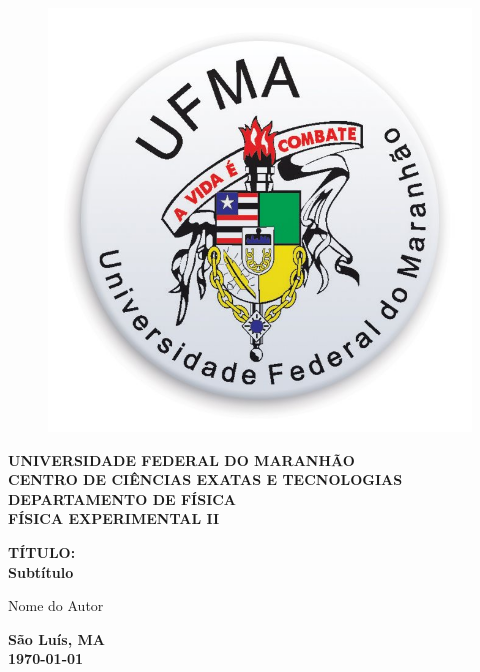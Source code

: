 \documentclass[
	12pt,				%
	oneside,			%
	a4paper,			%
	english,			%
	french,				%
	spanish,			%
	brazil				%
	]{abntex2}
\begin{document}

\frenchspacing 

\pretextual

\begin{center}			
	\begin{figure}[htb]
		\centering
		\includegraphics[scale=0.15]{ufmalogo.jpg}
	\end{figure}
				
			\textbf{UNIVERSIDADE FEDERAL DO MARANHÃO \\
					CENTRO DE CIÊNCIAS EXATAS E TECNOLOGIAS \\
					DEPARTAMENTO DE FÍSICA \\
					FÍSICA EXPERIMENTAL II\\\vspace{5cm}}
					
					\textbf{\large{TÍTULO:}\\
					\large{Subtítulo}}
					\vspace{3.5cm}
					\begin{flushright}
						\textnormal{Nome do Autor}
					\end{flushright}
					\vspace{4.5cm}
					\textbf{São Luís, MA \\ \today}
\end{center}
\end{document}
